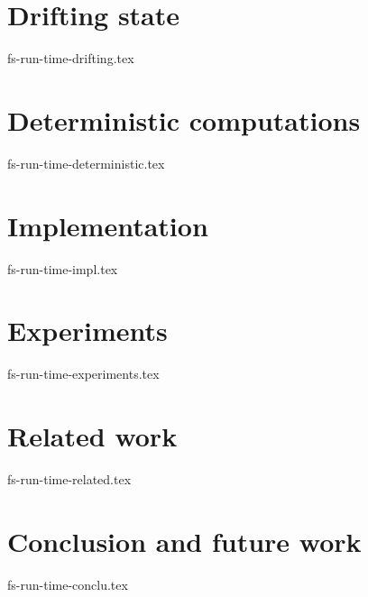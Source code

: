 \documentclass{llncs}
\begin{document}
\section{Drifting state}
 {fs-run-time-drifting.tex}

\section {Deterministic computations}
 {fs-run-time-deterministic.tex}

\section {Implementation}
 {fs-run-time-impl.tex}

\section {Experiments}
 {fs-run-time-experiments.tex}

\section {Related work}
 {fs-run-time-related.tex}

\section {Conclusion and future work}
 {fs-run-time-conclu.tex}



\end{document}
